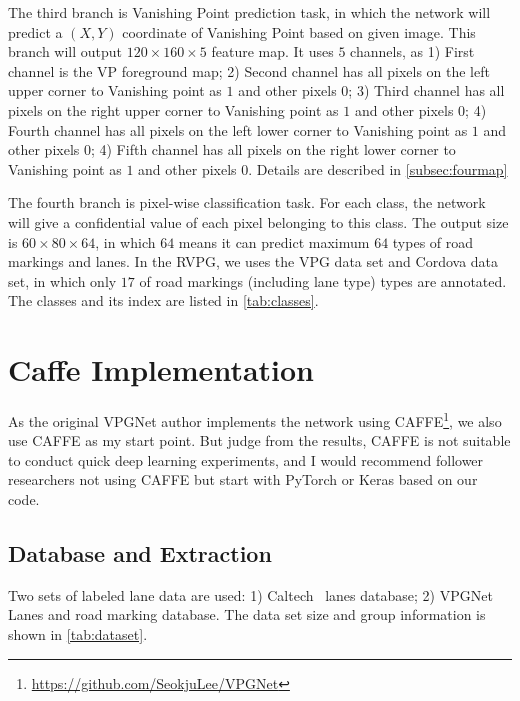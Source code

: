 \begin{spacing}{1.5}
The third branch is Vanishing Point prediction task, in which the network will predict a $(X,Y)$ coordinate of Vanishing Point based on given image. This branch will output $120 \times 160 \times 5$ feature map. It uses $5$ channels, as 1) First channel is the VP foreground map; 2) Second channel has all pixels on the left upper corner to Vanishing point as $1$ and other pixels $0$; 3) Third channel has all pixels on the right upper corner to Vanishing point as $1$ and other pixels $0$; 4) Fourth channel has all pixels on the left lower corner to Vanishing point as $1$ and other pixels $0$; 4) Fifth channel has all pixels on the right lower corner to Vanishing point as $1$ and other pixels $0$. Details are described in \autoref{subsec:fourmap}

The fourth branch is pixel-wise classification task. For each class, the network will give a confidential value of each pixel belonging to this class. The output size is $60 \times 80 \times 64$, in which $64$ means it can predict maximum $64$ types of road markings and lanes. In the RVPG, we uses the VPG data set and Cordova data set, in which only $17$ of road markings (including lane type) types are annotated. The classes and its index are listed in \autoref{tab:classes}.

\section{Caffe Implementation}
\label{sec:MD_CAFFE}

As the original VPGNet author implements the network using CAFFE\footnote{\url{https://github.com/SeokjuLee/VPGNet}}, we also use CAFFE as my start point. But judge from the results, CAFFE is not suitable to conduct quick deep learning experiments, and I would recommend follower researchers not using CAFFE but start with PyTorch or Keras based on our code.


\subsection{Database and Extraction}

Two sets of labeled lane data are used: 1) Caltech~\cite{caltech} lanes database; 2) VPGNet~\cite{lee2017vpgnet} Lanes and road marking database. The data set size and group information is shown in \autoref{tab:dataset}. 


\end{spacing}
